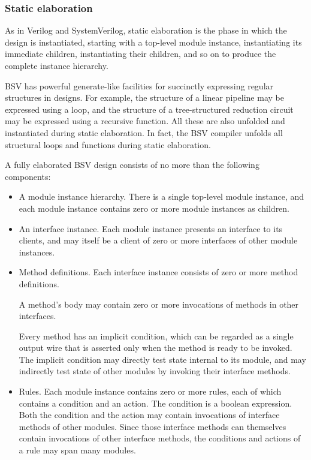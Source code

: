 \documentclass[twoside,letterpaper]{article}
\newcommand{\BSV}{BSV}
\newcommand{\SV}{SystemVerilog}
\newcommand{\V}{Verilog}
\begin{document}

\subsubsection{Static elaboration}


As in {\V} and {\SV}, static elaboration is the phase in which the
design is instantiated, starting with a top-level module instance,
instantiating its immediate children, instantiating their children,
and so on to produce the complete instance hierarchy.

{\BSV} has powerful generate-like facilities for succinctly expressing
regular structures in designs.  For example, the structure of a linear
pipeline may be expressed using a loop, and the structure of a
tree-structured reduction circuit may be expressed using a recursive
function.  All these are also unfolded and instantiated during static
elaboration.  In fact, the {\BSV} compiler unfolds all structural
loops and functions during static elaboration.

A fully elaborated {\BSV} design consists of no more than the
following components:
\begin{itemize}
\item
A module instance hierarchy.  There is a single top-level module
instance, and each module instance contains zero or more module
instances as children.

\item
An interface instance.  Each module instance presents an interface to
its clients, and may itself be a client of zero or more interfaces of
other module instances.

\item
Method definitions.  Each interface instance consists of zero or more
method definitions.

A method's body may contain zero or more invocations of methods in
other interfaces.

Every method has an implicit condition, which can be regarded as a
single output wire that is asserted only when the method is ready to
be invoked.  The implicit condition may directly test state internal
to its module, and may indirectly test state of other modules by
invoking their interface methods.

\item
Rules. Each module instance contains zero or more rules, each of which
contains a condition and an action.  The condition is a boolean
expression.  Both the condition and the action may contain invocations
of interface methods of other modules.  Since those interface methods
can themselves contain invocations of other interface methods, the
conditions and actions of a rule may span many modules.

\end{itemize}
\end{document}
